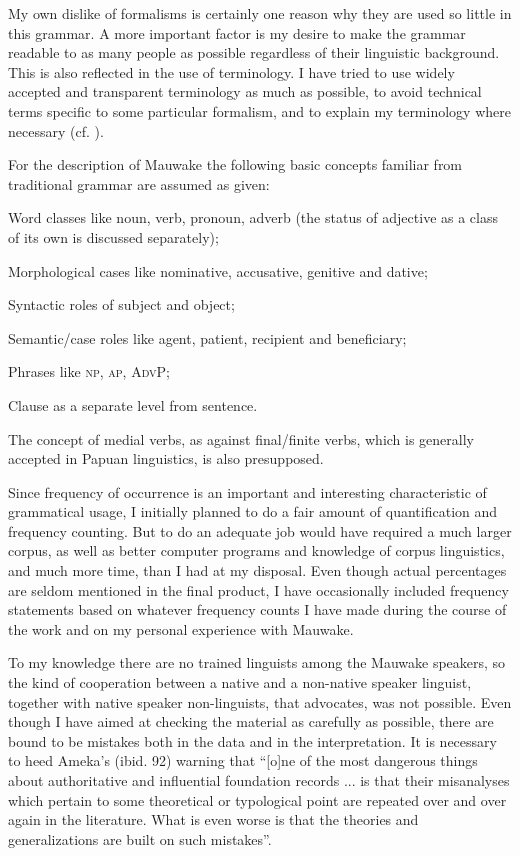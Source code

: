 My own dislike of formalisms is certainly one reason why they are used so little in this grammar.  A more important factor is my desire to make the grammar readable to as many people as possible regardless of their linguistic background. This is also reflected in the use of terminology. I have tried to use widely accepted and transparent terminology as much as possible, to avoid technical terms specific to some particular formalism, and to explain my terminology where necessary (cf. \citealt{Cristofaro2006}). 

For the description of Mauwake the following basic concepts familiar from traditional grammar are assumed as given:

Word classes like noun, verb, pronoun, adverb (the status of adjective as a class of its own is discussed separately);

Morphological cases like nominative, accusative, genitive and dative;

Syntactic roles of subject and object;

Semantic/case roles like agent, patient, recipient and beneficiary;

Phrases like \textsc{np}, \textsc{ap}, \textsc{AdvP};

Clause as a separate level from sentence. 

The concept of medial verbs, as against final/finite verbs, which is generally accepted in Papuan linguistics, is also presupposed. 

Since frequency of occurrence is an important and interesting characteristic of grammatical usage, I initially planned to do a fair amount of quantification and frequency counting.  But to do an adequate job would have required a much larger corpus, as well as better computer programs and knowledge of corpus linguistics, and much more time, than I had at my disposal. Even though actual percentages are seldom mentioned in the final product, I have occasionally included frequency statements based on whatever frequency counts I have made during the course of the work and on my personal experience with Mauwake. 

To my knowledge there are no trained linguists among the Mauwake speakers, so the kind of cooperation between a native and a non-native speaker linguist, together with native speaker non-linguists, that \citet{Ameka2006} advocates, was not possible.  Even though I have aimed at checking the material as carefully as possible, there are bound to be mistakes both in the data and in the interpretation. It is necessary to heed Ameka's (ibid. 92) warning that ``[o]ne of the most dangerous things about authoritative and influential foundation records ... is that their misanalyses which pertain to some theoretical or typological point are repeated over and over again in the literature.  What is even worse is that the theories and generalizations are built on such mistakes''. 

